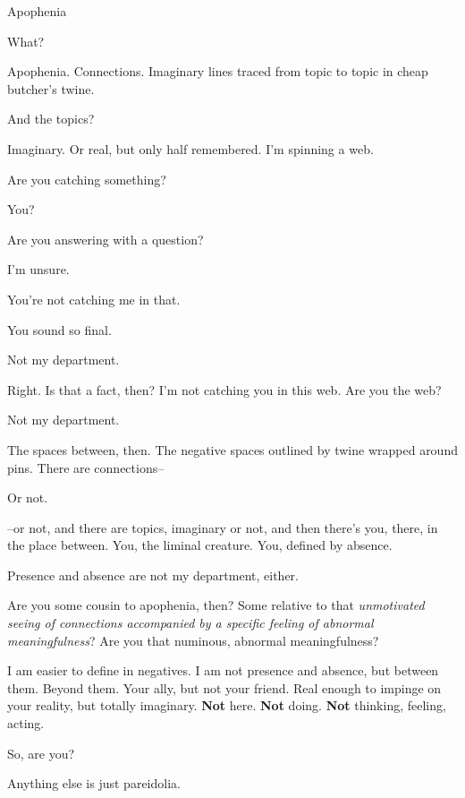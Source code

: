 \label{ally:26}
\begin{paracol}{2}
  \begin{leftcolumn}

\noindent Apophenia

\begin{ally}
What?
\end{ally}
Apophenia. Connections. Imaginary lines traced from topic to topic in cheap butcher's twine.

\begin{ally}
And the topics?
\end{ally}
Imaginary. Or real, but only half remembered. I'm spinning a web.

\begin{ally}
Are you catching something?
\end{ally}
You?

\begin{ally}
Are you answering with a question?
\end{ally}
I'm unsure.

\begin{ally}
You're not catching me in that.
\end{ally}
You sound so final.

\begin{ally}
Not my department.
\end{ally}
Right. Is that a fact, then? I'm not catching you in this web. Are you the web?

\begin{ally}
Not my department.
\end{ally}
The spaces between, then. The negative spaces outlined by twine wrapped around pins. There are connections--

\begin{ally}
Or not.
\end{ally}
--or not, and there are topics, imaginary or not, and then there's you, there, in the place between. You, the liminal creature. You, defined by absence.

\begin{ally}
Presence and absence are not my department, either.
\end{ally}
Are you some cousin to apophenia, then? Some relative to that \emph{unmotivated seeing of connections accompanied by a specific feeling of abnormal meaningfulness}? Are you that numinous, abnormal meaningfulness?

\begin{ally}
I am easier to define in negatives. I am not presence and absence, but between them. Beyond them. Your ally, but not your friend. Real enough to impinge on your reality, but totally imaginary. \textbf{Not} here. \textbf{Not} doing. \textbf{Not} thinking, feeling, acting.
\end{ally}
So, are you?

\begin{ally}
Anything else is just pareidolia.
\end{ally}
\newpage
\end{leftcolumn}
\end{paracol}
